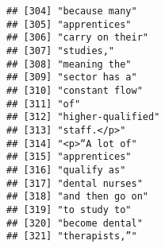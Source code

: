 \documentclass[]{article}
\begin{document}
\begin{verbatim}
## [304] "because many"                                                                                                                             
## [305] "apprentices"                                                                                                                              
## [306] "carry on their"                                                                                                                           
## [307] "studies,"                                                                                                                                 
## [308] "meaning the"                                                                                                                              
## [309] "sector has a"                                                                                                                             
## [310] "constant flow"                                                                                                                            
## [311] "of"                                                                                                                                       
## [312] "higher-qualified"                                                                                                                         
## [313] "staff.</p>"                                                                                                                               
## [314] "<p>“A lot of"                                                                                                                             
## [315] "apprentices"                                                                                                                              
## [316] "qualify as"                                                                                                                               
## [317] "dental nurses"                                                                                                                            
## [318] "and then go on"                                                                                                                           
## [319] "to study to"                                                                                                                              
## [320] "become dental"                                                                                                                            
## [321] "therapists,”"                                                                                                                             

\end{verbatim}
\end{document}
